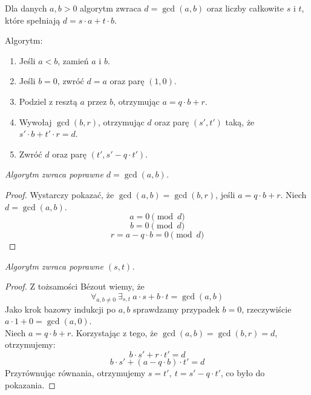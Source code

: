 Dla danych \( a, b > 0 \) algorytm zwraca \( d = \gcd(a,b) \) oraz liczby całkowite \( s \) i \( t \), które spełniają \( d = s\cdot a + t\cdot b \).

\begin{greyframe}
    Algorytm:
    \begin{enumerate}
        \item Jeśli \( a < b \), zamień \( a \) i \( b \).
        \item Jeśli \( b = 0 \), zwróć \( d = a \) oraz parę \( (1,0) \).
        \item Podziel z resztą \( a \) przez \( b \), otrzymując \( a = q \cdot b + r \).
        \item Wywołaj \( \gcd(b,r) \), otrzymując \( d \) oraz parę \( (s', t') \) taką, że \( s'\cdot b + t' \cdot r = d \).
        \item Zwróć \( d \) oraz parę \( (t', s' - q \cdot t') \).
    \end{enumerate}
\end{greyframe}

\vspace{1em}\noindent
\textit{Algorytm zwraca poprawne \( d = \gcd(a, b) \).}
\begin{proof}
    Wystarczy pokazać, że \( \gcd(a, b) = \gcd(b, r) \), jeśli \( a = q \cdot b + r \). Niech \( d = \gcd(a, b) \).
    \[
        a = 0 \pmod{d}
    \]
    \[
        b = 0 \pmod{d}
    \]
    \[
        r = a - q \cdot b = 0 \pmod{d}
    \]
\end{proof}
\textit{Algorytm zwraca poprawne \( (s, t) \).}
\begin{proof}
    Z tożsamości B\'ezout wiemy, że
    \[
        \forall_{a, b \not= 0 } \ \exists_{s, t} \ a \cdot s + b \cdot t = \gcd(a, b)
    \]
    Jako krok bazowy indukcji po \( a, b \) sprawdzamy przypadek \( b = 0 \), rzeczywiście \( a \cdot 1 + 0 = \gcd(a, 0) \). \\
    Niech \( a = q \cdot b + r \). Korzystając z tego, że \( \gcd(a, b) = \gcd(b, r) = d \), otrzymujemy:
    \[
        b \cdot s' + r \cdot t' = d
    \]
    \[
        b \cdot s' + (a - q \cdot b) \cdot t' = d
    \]
    Przyrównując równania, otrzymujemy \( s = t', \ t = s' - q \cdot t' \), co było do pokazania.
\end{proof}

